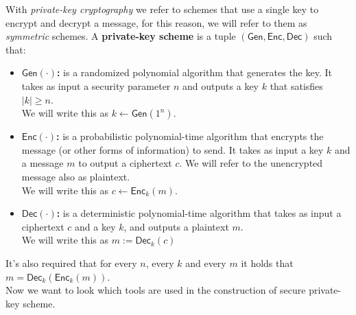 With \emph{private-key cryptography} we refer to schemes that use a single key to encrypt and decrypt a message, for this reason, we will refer to them as \emph{symmetric} schemes.
A \textbf{private-key scheme} is a tuple $(\mathsf{Gen}, \mathsf{Enc}, \mathsf{Dec})$ such that:
\begin{itemize}
    \item{\textbf{$\mathsf{Gen}(\cdot)$:} is a randomized polynomial algorithm that generates the key. It takes as input a security parameter $n$ and outputs a key $k$ that satisfies $|k| \geq n$.\\
        We will write this as $k \leftarrow \mathsf{Gen}(1^n)$.}
    \item{\textbf{$\mathsf{Enc}(\cdot)$:} is a probabilistic polynomial-time algorithm that encrypts the message (or other forms of information) to send. It takes as input a key $k$ and a message $m$ to output a ciphertext $c$. We will refer to the unencrypted message also as plaintext.\\
        We will write this as $c \leftarrow \mathsf{Enc}_k(m)$.}
    \item{\textbf{$\mathsf{Dec}(\cdot)$:} is a deterministic polynomial-time algorithm that takes as input a ciphertext $c$ and a key $k$, and outputs a plaintext $m$.\\
        We will write this as $m := \mathsf{Dec}_k(c)$}
\end{itemize}
It's also required that for every $n$, every $k$ and every $m$ it holds that $m = \mathsf{Dec}_k(\mathsf{Enc}_k(m))$.\\
Now we want to look which tools are used in the construction of secure private-key scheme.
